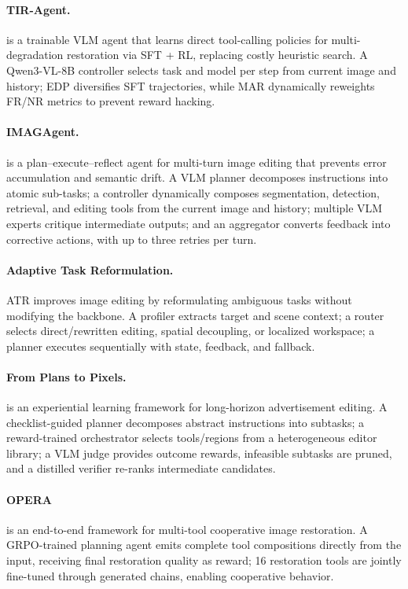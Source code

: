 \paragraph{TIR-Agent.}
is a trainable VLM agent that learns direct tool-calling policies for multi-degradation restoration via SFT + RL, replacing costly heuristic search. A Qwen3-VL-8B controller selects task and model per step from current image and history; EDP diversifies SFT trajectories, while MAR dynamically reweights FR/NR metrics to prevent reward hacking. ~\cite{avg260327742}

\paragraph{IMAGAgent.}
 is a plan–execute–reflect agent for multi-turn image editing that prevents error accumulation and semantic drift. A VLM planner decomposes instructions into atomic sub-tasks; a controller dynamically composes segmentation, detection, retrieval, and editing tools from the current image and history; multiple VLM experts critique intermediate outputs; and an aggregator converts feedback into corrective actions, with up to three retries per turn. ~\cite{avg260329602}

\paragraph{Adaptive Task Reformulation.}
ATR improves image editing by reformulating ambiguous tasks without modifying the backbone. A profiler extracts target and scene context; a router selects direct/rewritten editing, spatial decoupling, or localized workspace; a planner executes sequentially with state, feedback, and fallback. ~\cite{avg260415917}

\paragraph{From Plans to Pixels.}
 is an experiential learning framework for long-horizon advertisement editing. A checklist-guided planner decomposes abstract instructions into subtasks; a reward-trained orchestrator selects tools/regions from a heterogeneous editor library; a VLM judge provides outcome rewards, infeasible subtasks are pruned, and a distilled verifier re-ranks intermediate candidates. ~\cite{avg260515181}

\paragraph{OPERA}
 is an end-to-end framework for multi-tool cooperative image restoration. A GRPO-trained planning agent emits complete tool compositions directly from the input, receiving final restoration quality as reward; 16 restoration tools are jointly fine-tuned through generated chains, enabling cooperative behavior. ~\cite{avg260522104}

